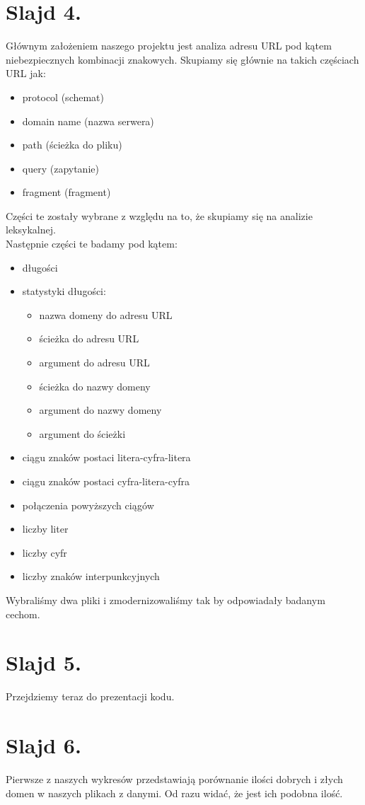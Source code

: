 \documentclass{article}
\begin{document}
\section{Slajd 4.}
{
	Głównym założeniem naszego projektu jest analiza adresu URL pod kątem niebezpiecznych kombinacji znakowych. Skupiamy się głównie na takich częściach URL jak:
	\begin{itemize}
		\item protocol (schemat)
		\item domain name (nazwa serwera)
		\item path (ścieżka do pliku)
		\item query (zapytanie)
		\item fragment (fragment)
	\end{itemize}
	Części te zostały wybrane z względu na to, że skupiamy się na analizie leksykalnej.\\
	Następnie części te badamy pod kątem:
	\begin{itemize}
		\item długości
		\item statystyki długości:
			\begin{itemize}
				\item nazwa domeny do adresu URL
				\item ścieżka do adresu URL
				\item argument do adresu URL
				\item ścieżka do nazwy domeny
				\item argument do nazwy domeny
				\item argument do ścieżki
			\end{itemize}
		\item ciągu znaków postaci litera-cyfra-litera
		\item ciągu znaków postaci cyfra-litera-cyfra
		\item połączenia powyższych ciągów
		\item liczby liter
		\item liczby cyfr
		\item liczby znaków interpunkcyjnych
	\end{itemize}
	Wybraliśmy dwa pliki i zmodernizowaliśmy tak by odpowiadały badanym cechom.
}
\section{Slajd 5.}
{
	Przejdziemy teraz do prezentacji kodu.
}
\section{Slajd 6.}
{
	Pierwsze z naszych wykresów przedstawiają porównanie ilości dobrych i złych domen w naszych plikach z danymi. Od razu widać, że jest ich podobna ilość.
}
\end{document}
